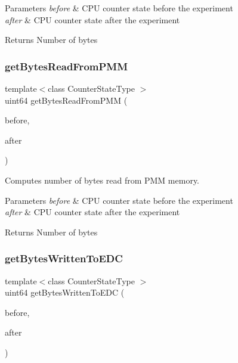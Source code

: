 \begin{DoxyParams}{Parameters}
{\em before} & C\+PU counter state before the experiment \\
\hline
{\em after} & C\+PU counter state after the experiment \\
\hline
\end{DoxyParams}
\begin{DoxyReturn}{Returns}
Number of bytes 
\end{DoxyReturn}
\mbox{\label{classUncoreCounterState_afba35ab2fa127ac0af819a1134711722}} 
\subsubsection{get\+Bytes\+Read\+From\+P\+MM}
{\footnotesize\ttfamily template$<$class Counter\+State\+Type $>$ \\
uint64 get\+Bytes\+Read\+From\+P\+MM (\begin{DoxyParamCaption}\item[{const Counter\+State\+Type \&}]{before,  }\item[{const Counter\+State\+Type \&}]{after }\end{DoxyParamCaption})\hspace{0.3cm}{\ttfamily [friend]}}



Computes number of bytes read from P\+MM memory. 


\begin{DoxyParams}{Parameters}
{\em before} & C\+PU counter state before the experiment \\
\hline
{\em after} & C\+PU counter state after the experiment \\
\hline
\end{DoxyParams}
\begin{DoxyReturn}{Returns}
Number of bytes 
\end{DoxyReturn}
\mbox{\label{classUncoreCounterState_aface6421f7c3e654bcf411abd7cea990}} 
\subsubsection{get\+Bytes\+Written\+To\+E\+DC}
{\footnotesize\ttfamily template$<$class Counter\+State\+Type $>$ \\
uint64 get\+Bytes\+Written\+To\+E\+DC (\begin{DoxyParamCaption}\item[{const Counter\+State\+Type \&}]{before,  }\item[{const Counter\+State\+Type \&}]{after }\end{DoxyParamCaption})\hspace{0.3cm}{\ttfamily [friend]}}



